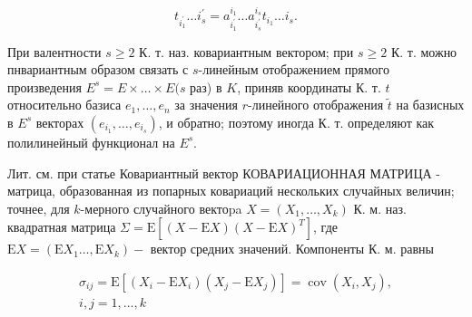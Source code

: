 \documentclass[10pt]{article}
\begin{document}
\[

t_{i_{1}^{\prime}} \ldots i_{s}^{\prime}=a_{i_{1}^{\prime}}^{i_{1}} \ldots a_{i_{s}^{\prime}}^{i_{s}} t_{i_{1}} \ldots i_{s} .

\]



При валентности $s \geqslant 2$ К. т. наз. ковариантным вектором; при $s \geqslant 2$ К. т. можно пнвариантным образом связать с $s$-линейным отображением прямого произведения $E^{s}=E \times \ldots \times E(s$ раз) в $K$, приняв координаты К. т. $t$ относительно базиса $e_{1}, \ldots, e_{n}$ за значения $r$-линейного отображения $\tilde{t}$ на базисных в $E^{s}$ векторах $\left(e_{i_{1}}, \ldots, e_{i_{s}}\right)$, и обратно; поэтому иногда К. т. определяют как полилинейный функционал на $E^{s}$.



Лит. см. при статье Ковариантный вектор КОВАРИАЦИОННАЯ МАТРИЦА - матрица, образованная из попарных ковариаций нескольких случайных величин; точнее, для $k$-мерного случайного вектоpa $X=\left(X_{1}, \ldots, X_{k}\right)$ К. м. наз. квадратная матрица $\Sigma=\mathrm{E}\left[(X-\mathrm{E} X)(X-\mathrm{E} X)^{T}\right]$, где $\mathrm{E} X=\left(\mathrm{E} X_{1} \ldots, \mathrm{E} X_{k}\right)-$ вектор средних значений. Компоненты К. м. равны



\[

\begin{gathered}

\sigma_{i j}=\mathrm{E}\left[\left(X_{i}-\mathrm{E} X_{i}\right)\left(X_{j}-\mathrm{E} X_{j}\right)\right]=\operatorname{cov}\left(X_{i}, X_{j}\right), \\

i, j=1, \ldots, k

\end{gathered}

\]
\end{document}
